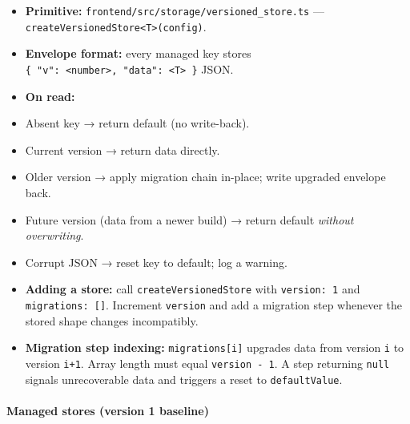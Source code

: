 \documentclass[]{article}
\providecommand{\tightlist}{%
  \setlength{\itemsep}{0pt}\setlength{\parskip}{0pt}}
\let\oldparagraph\paragraph
\renewcommand{\paragraph}[1]{\oldparagraph{#1}\mbox{}}
\begin{document}
\begin{itemize}
\tightlist
\item
  \textbf{Primitive:} \texttt{frontend/src/storage/versioned\_store.ts}
  --- \texttt{createVersionedStore\textless{}T\textgreater{}(config)}.
\item
  \textbf{Envelope format:} every managed key stores
  \texttt{\{\ "v":\ \textless{}number\textgreater{},\ "data":\ \textless{}T\textgreater{}\ \}}
  JSON.
\item
  \textbf{On read:}
\item
  Absent key → return default (no write-back).
\item
  Current version → return data directly.
\item
  Older version → apply migration chain in-place; write upgraded
  envelope back.
\item
  Future version (data from a newer build) → return default
  \emph{without overwriting}.
\item
  Corrupt JSON → reset key to default; log a warning.
\item
  \textbf{Adding a store:} call \texttt{createVersionedStore} with
  \texttt{version:\ 1} and \texttt{migrations:\ {[}{]}}. Increment
  \texttt{version} and add a migration step whenever the stored shape
  changes incompatibly.
\item
  \textbf{Migration step indexing:} \texttt{migrations{[}i{]}} upgrades
  data from version \texttt{i} to version \texttt{i+1}. Array length
  must equal \texttt{version\ -\ 1}. A step returning \texttt{null}
  signals unrecoverable data and triggers a reset to
  \texttt{defaultValue}.
\end{itemize}

\paragraph{Managed stores (version 1
baseline)}\label{managed-stores-version-1-baseline}
\end{document}

